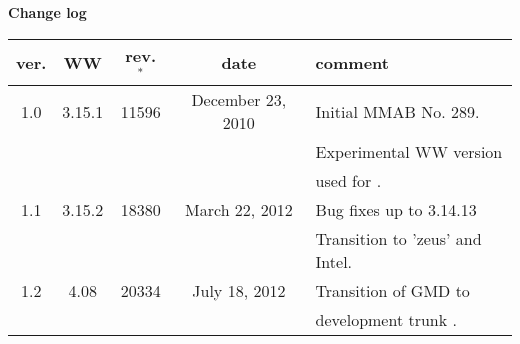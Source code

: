 \documentclass[12pt]{article}
\newcommand{\pstyle}{myheadings}
\newcommand{\ww}{WAVEWATCH III}
\begin{document}
\pagestyle{\pstyle}
\setcounter{page}{1}


\begin{abstract}
This report describes a genetic optimization package for the Generalized
Multiple DIA (GMD) in the \ww\ modeling framework. This report will be updated
as needed, depending upon development of this package or of the underlying
wave model.
\end{abstract}

\vspace{\baselineskip}
\vspace{\baselineskip}

\begin{center}
{\bf Change log} \\
\vspace{\baselineskip}
\begin{tabular}{|c|c|c|c|l|} \hline
ver. &   WW   & rev. $^*$   & date    & comment    \\ \hline \hline
 1.0 & 3.15.1 &  11596 & December 23, 2010 & Initial MMAB No. 289.          \\
     &        &        &                   & Experimental WW version        \\
     &        &        &                   & used for \cite{tol:MMAB10d}.   \\ \hline
 1.1 & 3.15.2 &  18380 &  March 22, 2012   & Bug fixes up to 3.14.13        \\
     &        &        &                   & Transition to 'zeus' and Intel.\\ \hline
 1.2 &  4.08  &  20334 &  July 18, 2012    & Transition of GMD to           \\
     &        &        &                   & development trunk .            \\ \hline 
 \hline 
\end{tabular}
\end{center}
\end{document}
